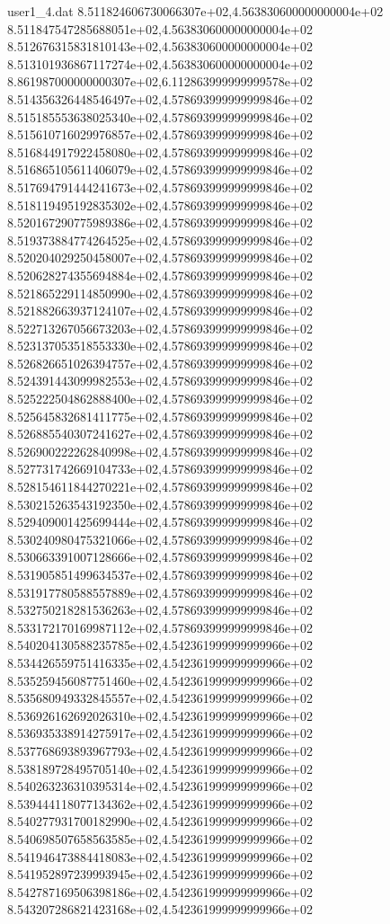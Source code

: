 \begin{filecontents}{user1_4.dat}
8.511824606730066307e+02,4.563830600000000004e+02
8.511847547285688051e+02,4.563830600000000004e+02
8.512676315831810143e+02,4.563830600000000004e+02
8.513101936867117274e+02,4.563830600000000004e+02
8.861987000000000307e+02,6.112863999999999578e+02
8.514356326448546497e+02,4.578693999999999846e+02
8.515185553638025340e+02,4.578693999999999846e+02
8.515610716029976857e+02,4.578693999999999846e+02
8.516844917922458080e+02,4.578693999999999846e+02
8.516865105611406079e+02,4.578693999999999846e+02
8.517694791444241673e+02,4.578693999999999846e+02
8.518119495192835302e+02,4.578693999999999846e+02
8.520167290775989386e+02,4.578693999999999846e+02
8.519373884774264525e+02,4.578693999999999846e+02
8.520204029250458007e+02,4.578693999999999846e+02
8.520628274355694884e+02,4.578693999999999846e+02
8.521865229114850990e+02,4.578693999999999846e+02
8.521882663937124107e+02,4.578693999999999846e+02
8.522713267056673203e+02,4.578693999999999846e+02
8.523137053518553330e+02,4.578693999999999846e+02
8.526826651026394757e+02,4.578693999999999846e+02
8.524391443099982553e+02,4.578693999999999846e+02
8.525222504862888400e+02,4.578693999999999846e+02
8.525645832681411775e+02,4.578693999999999846e+02
8.526885540307241627e+02,4.578693999999999846e+02
8.526900222262840998e+02,4.578693999999999846e+02
8.527731742669104733e+02,4.578693999999999846e+02
8.528154611844270221e+02,4.578693999999999846e+02
8.530215263543192350e+02,4.578693999999999846e+02
8.529409001425699444e+02,4.578693999999999846e+02
8.530240980475321066e+02,4.578693999999999846e+02
8.530663391007128666e+02,4.578693999999999846e+02
8.531905851499634537e+02,4.578693999999999846e+02
8.531917780588557889e+02,4.578693999999999846e+02
8.532750218281536263e+02,4.578693999999999846e+02
8.533172170169987112e+02,4.578693999999999846e+02
8.540204130588235785e+02,4.542361999999999966e+02
8.534426559751416335e+02,4.542361999999999966e+02
8.535259456087751460e+02,4.542361999999999966e+02
8.535680949332845557e+02,4.542361999999999966e+02
8.536926162692026310e+02,4.542361999999999966e+02
8.536935338914275917e+02,4.542361999999999966e+02
8.537768693893967793e+02,4.542361999999999966e+02
8.538189728495705140e+02,4.542361999999999966e+02
8.540263236310395314e+02,4.542361999999999966e+02
8.539444118077134362e+02,4.542361999999999966e+02
8.540277931700182990e+02,4.542361999999999966e+02
8.540698507658563585e+02,4.542361999999999966e+02
8.541946473884418083e+02,4.542361999999999966e+02
8.541952897239993945e+02,4.542361999999999966e+02
8.542787169506398186e+02,4.542361999999999966e+02
8.543207286821423168e+02,4.542361999999999966e+02

\end{filecontents}
